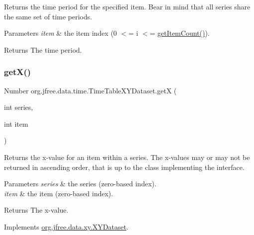 Returns the time period for the specified item. Bear in mind that all series share the same set of time periods.


\begin{DoxyParams}{Parameters}
{\em item} & the item index (0 $<$= i $<$= \mbox{\hyperlink{classorg_1_1jfree_1_1data_1_1time_1_1_time_table_x_y_dataset_ad80a7fca84f962b49d80b1c1f4f745a4}{get\+Item\+Count()}}).\\
\hline
\end{DoxyParams}
\begin{DoxyReturn}{Returns}
The time period. 
\end{DoxyReturn}
\mbox{\label{classorg_1_1jfree_1_1data_1_1time_1_1_time_table_x_y_dataset_a5b64bfd810fe031ffaded80c28a6c345}} 
\subsubsection{\texorpdfstring{get\+X()}{getX()}}
{\footnotesize\ttfamily Number org.\+jfree.\+data.\+time.\+Time\+Table\+X\+Y\+Dataset.\+getX (\begin{DoxyParamCaption}\item[{int}]{series,  }\item[{int}]{item }\end{DoxyParamCaption})}

Returns the x-\/value for an item within a series. The x-\/values may or may not be returned in ascending order, that is up to the class implementing the interface.


\begin{DoxyParams}{Parameters}
{\em series} & the series (zero-\/based index). \\
\hline
{\em item} & the item (zero-\/based index).\\
\hline
\end{DoxyParams}
\begin{DoxyReturn}{Returns}
The x-\/value. 
\end{DoxyReturn}


Implements \mbox{\hyperlink{interfaceorg_1_1jfree_1_1data_1_1xy_1_1_x_y_dataset_a85c75ba5b69b551e96afd29d1732ba22}{org.\+jfree.\+data.\+xy.\+X\+Y\+Dataset}}.


